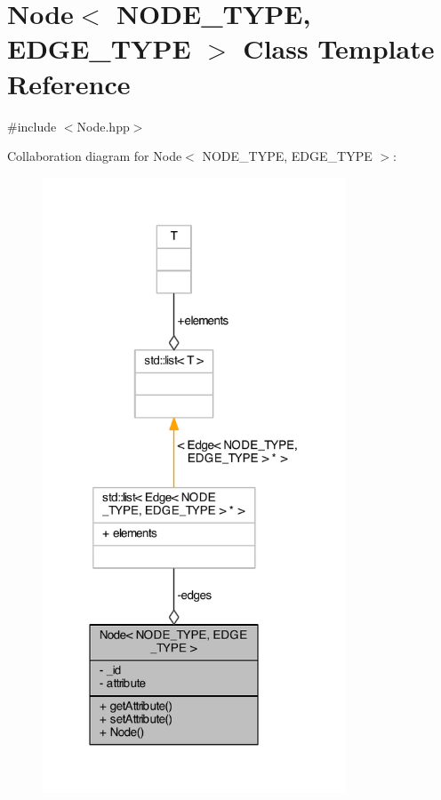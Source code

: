 \hypertarget{class_node}{\section{Node$<$ N\+O\+D\+E\+\_\+\+T\+Y\+P\+E, E\+D\+G\+E\+\_\+\+T\+Y\+P\+E $>$ Class Template Reference}
\label{class_node}
}


{\ttfamily \#include $<$Node.\+hpp$>$}



Collaboration diagram for Node$<$ N\+O\+D\+E\+\_\+\+T\+Y\+P\+E, E\+D\+G\+E\+\_\+\+T\+Y\+P\+E $>$\+:\nopagebreak
\begin{figure}[H]
\begin{center}
\leavevmode
\includegraphics[width=256pt]{class_node__coll__graph}
\end{center}
\end{figure}
